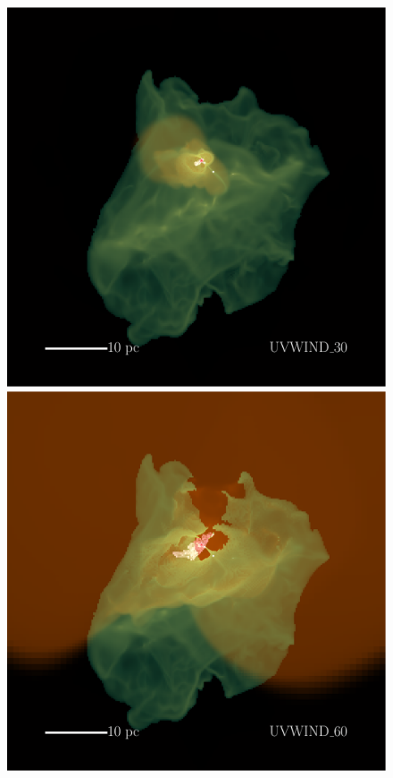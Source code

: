\documentclass[a4paper,fleqn,usenatbib]{mnras}
\begin{document}
\begin{figure}
	\includegraphics[width=1\columnwidth]{plots/fig13a.pdf} \includegraphics[width=1\columnwidth]{plots/fig13b.pdf}

\end{figure}
\end{document}
